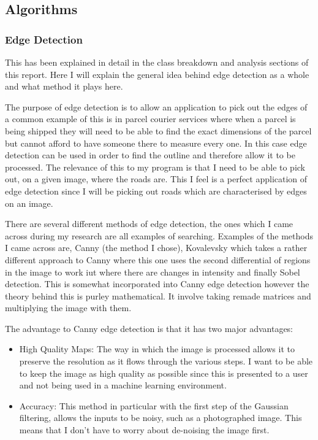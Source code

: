 \begin{FlushLeft}
    \BK

    \subsection{Algorithms}

    \subsubsection{Edge Detection}
    This has been explained in detail in the class breakdown and analysis sections of this report. Here I will explain the general idea behind edge detection as a whole and what method it plays here. \\ \bk

    The purpose of edge detection is to allow an application to pick out the edges of a common example of this is in parcel courier services where when a parcel is being shipped they will need to be able to find the exact dimensions of the parcel but cannot afford to have someone there to measure every one. In this case edge detection can be used in order to find the outline and therefore allow it to be processed. The relevance of this to my program is that I need to be able to pick out, on a given image, where the roads are. This I feel is a perfect application of edge detection since I will be picking out roads which are characterised by edges on an image. \\ \bk

    There are several different methods of edge detection, the ones which I came across during my research are all examples of searching. Examples of the methods I came across are, Canny (the method I chose), Kovalevsky which takes a rather different approach to Canny where this one uses the second differential of regions in the image to work iut where there are changes in intensity and finally Sobel detection. This is somewhat incorporated into Canny edge detection however the theory behind this is purley mathematical. It involve taking remade matrices and multiplying the image with them. \\ \bk

    The advantage to Canny edge detection is that it has two major advantages:
    \begin{itemize}
        \item High Quality Maps: The way in which the image is processed allows it to preserve the resolution as it flows through the various steps. I want to be able to keep the image as high quality as possible since this is presented to a user and not being used in a machine learning environment.
        \item Accuracy: This method in particular with the first step of the Gaussian filtering, allows the inputs to be noisy, such as a photographed image. This means that I don't have to worry about de-noising the image first. 
    \end{itemize}


\end{FlushLeft}
